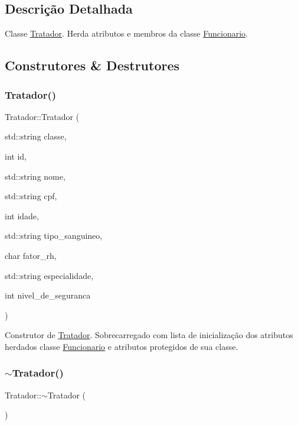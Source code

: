 \subsection{Descrição Detalhada}
Classe \hyperlink{classTratador}{Tratador}. Herda atributos e membros da classe \hyperlink{classFuncionario}{Funcionario}. 

\subsection{Construtores \& Destrutores}
\mbox{\label{classTratador_a0b049deab10d9fbb4ed02659cb464650}} 
\subsubsection{\texorpdfstring{Tratador()}{Tratador()}}
{\footnotesize\ttfamily Tratador\+::\+Tratador (\begin{DoxyParamCaption}\item[{std\+::string}]{classe,  }\item[{int}]{id,  }\item[{std\+::string}]{nome,  }\item[{std\+::string}]{cpf,  }\item[{int}]{idade,  }\item[{std\+::string}]{tipo\+\_\+sanguineo,  }\item[{char}]{fator\+\_\+rh,  }\item[{std\+::string}]{especialidade,  }\item[{int}]{nivel\+\_\+de\+\_\+seguranca }\end{DoxyParamCaption})}

Construtor de \hyperlink{classTratador}{Tratador}. Sobrecarregado com lista de inicialização dos atributos herdados classe \hyperlink{classFuncionario}{Funcionario} e atributos protegidos de sua classe. \mbox{\label{classTratador_a8750ed6960e786da5d6f87e05b491093}} 
\subsubsection{\texorpdfstring{$\sim$\+Tratador()}{~Tratador()}}
{\footnotesize\ttfamily Tratador\+::$\sim$\+Tratador (\begin{DoxyParamCaption}{ }\end{DoxyParamCaption})}


